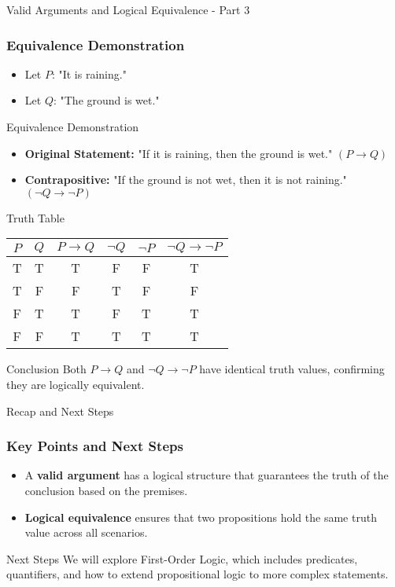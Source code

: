 \documentclass[aspectratio=169]{beamer}
\begin{document}
\begin{frame}[fragile]{Valid Arguments and Logical Equivalence - Part 3}
    \frametitle{Equivalence Demonstration}

    \begin{itemize}
        \item Let $P$: "It is raining." 
        \item Let $Q$: "The ground is wet."
    \end{itemize}

    \begin{block}{Equivalence Demonstration}
        \begin{itemize}
            \item \textbf{Original Statement:} "If it is raining, then the ground is wet." $(P \rightarrow Q)$
            \item \textbf{Contrapositive:} "If the ground is not wet, then it is not raining." $(\neg Q \rightarrow \neg P)$
        \end{itemize}
    \end{block}

    \begin{block}{Truth Table}
        \centering
        \begin{tabular}{|c|c|c|c|c|c|}
            \hline
            $P$ & $Q$ & $P \rightarrow Q$ & $\neg Q$ & $\neg P$ & $\neg Q \rightarrow \neg P$ \\
            \hline
            T & T & T & F & F & T \\
            T & F & F & T & F & F \\
            F & T & T & F & T & T \\
            F & F & T & T & T & T \\
            \hline
        \end{tabular}
    \end{block}

    \begin{block}{Conclusion}
        Both $P \rightarrow Q$ and $\neg Q \rightarrow \neg P$ have identical truth values, confirming they are logically equivalent.
    \end{block}
\end{frame}

\begin{frame}[fragile]{Recap and Next Steps}
    \frametitle{Key Points and Next Steps}

    \begin{itemize}
        \item A \textbf{valid argument} has a logical structure that guarantees the truth of the conclusion based on the premises.
        \item \textbf{Logical equivalence} ensures that two propositions hold the same truth value across all scenarios.
    \end{itemize}

    \begin{block}{Next Steps}
        We will explore First-Order Logic, which includes predicates, quantifiers, and how to extend propositional logic to more complex statements.
    \end{block}
\end{frame}
\end{document}
